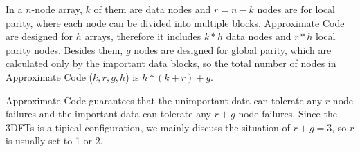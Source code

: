 \documentclass[sigconf]{acmart}
\begin{document}
In a $n$-node array, $k$ of them are data nodes and $r=n-k$ nodes are for local parity, where each node can be divided into multiple blocks.
Approximate Code are designed for $h$ arrays, therefore it includes $k*h$ data nodes and $r*h$ local parity nodes.
Besides them, $g$ nodes are designed for global parity, which are calculated only by the important data blocks, so the total number of nodes in Approximate Code ($k,r,g,h$) is 
$h*(k+r) + g$.

Approximate Code guarantees that the unimportant data can tolerate any $r$ node failures and the important data can tolerate any $r+g$ node failures.
Since the 3DFTs is a tipical configuration, we mainly discuss the situation of $r+g=3$, so $r$ is usually set to 1 or 2.

\end{document}

